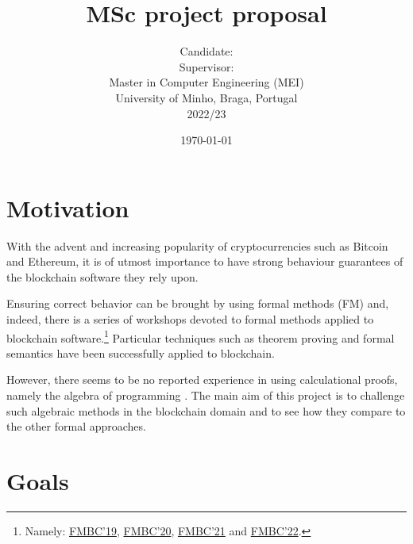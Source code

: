 \documentclass[a4paper, 11pt]{article} %
\title{\textbf{MSc project proposal}\\ \vspace{0.5cm}\msctitle}
\author{
	  Candidate:  \textsc{\msccandidate}
	\\Supervisor: \textsc{\mscsupervisor}
	\\
	\vspace{0.5cm}
    \normalsize{Master in Computer Engineering (MEI)\\ University of Minho, Braga, Portugal}
    \\ 2022/23
    } %
\date{\today}
\makeatletter
\renewcommand{\maketitle}{ %
\begin{center} %
{\LARGE\@title} %

\vspace{50pt} %

{\large\@author} %

\vspace{40pt} %
\end{center}
}
\makeatother
\begin{document}
\maketitle %






\section*{Motivation}

With the advent and increasing popularity of cryptocurrencies such as Bitcoin and Ethereum, it is of utmost importance to have strong behaviour guarantees of the blockchain software they rely upon.

Ensuring correct behavior can be brought by using formal methods (FM) and,
indeed, there is a series of workshops devoted to formal methods applied
to blockchain software.\footnote{\label{fn:221012a} Namely: \href{https://sites.google.com/view/fmbc}{FMBC'19}, \href{https://fmbc.gitlab.io/2020}{FMBC'20}, \href{https://fmbc.gitlab.io/2021}{FMBC'21} and \href{https://fmbc.gitlab.io/2022}{FMBC'22}.} Particular techniques such as theorem proving and
formal semantics have been successfully applied to blockchain.

However, there seems
to be no reported experience in using calculational proofs, namely the algebra
of programming \cite{BM97,Ol05}. The main aim of this project is to challenge such algebraic methods
in the blockchain domain and to see how they compare to the other formal approaches.

\section*{Goals}
\end{document}
